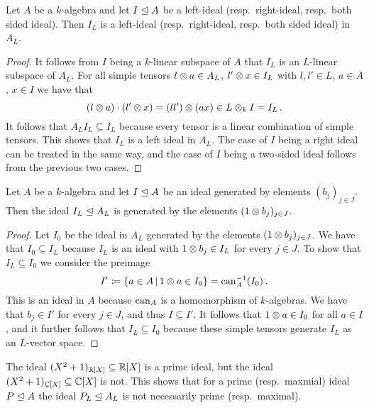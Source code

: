 \begin{lemma}
  Let $A$ be a $k$-algebra and let $I \trianglelefteq A$ be a left-ideal (resp.\ right-ideal, resp.\ both sided ideal).
  Then $I_L$ is a left-ideal (resp.\ right-ideal, resp.\ both sided ideal) in $A_L$.
\end{lemma}
\begin{proof}
  It follows from $I$ being a $k$-linear subspace of $A$ that $I_L$ is an $L$-linear subspace of $A_L$.
  For all simple tensors $l \mathbin{\otimes} a \in A_L$, $l' \mathbin{\otimes} x \in I_L$ with $l, l' \in L$, $a \in A$, $x \in I$ we have that
  \[
        (l \mathbin{\otimes} a) \cdot (l' \mathbin{\otimes} x)
    =   (l l') \mathbin{\otimes} (a x)
    \in L \mathbin{\otimes}_k I
    =   I_L \,.
  \]
  It follows that $A_L I_L \subseteq I_L$ because every tensor is a linear combination of simple tensors.
  This shows that $I_L$ is a left ideal in $A_L$.
  The case of $I$ being a right ideal can be treated in the same way, and the case of $I$ being a two-sided ideal follows from the previous two cases.
\end{proof}


\begin{lemma}
  Let $A$ be a $k$-algebra and let $I \trianglelefteq A$ be an ideal generated by elements $(b_j)_{j \in J}$.
  Then the ideal $I_L \trianglelefteq A_L$ is generated by the elements $(1 \mathbin{\otimes} b_j)_{j \in J}$.
\end{lemma}
\begin{proof}
  Let $I_0$ be the ideal in $A_L$ generated by the elements $(1 \mathbin{\otimes} b_j)_{j \in J}$.
  We have that $I_0 \subseteq I_L$ because $I_L$ is an ideal with $1 \mathbin{\otimes} b_j \in I_L$ for every $j \in J$.
  To show that $I_L \subseteq I_0$ we consider the preimage
  \[
              I'
    \defined  \{
                a \in A
              \suchthat
                1 \tensor a \in I_0
              \}
    =         \can_A^{-1}(I_0) \,.
  \]
  This is an ideal in $A$ because $\operatorname{can}_A$ is a homomorphism of $k$-algebras.
  We have that $b_j \in I'$ for every $j \in J$, and thus $I \subseteq I'$.
  It follows that $1 \mathbin{\otimes} a \in I_0$ for all $a \in I$, and it further follows that $I_L \subseteq I_0$ because these simple tensors generate $I_L$ as an $L$-vector space.
\end{proof}


\begin{warning}
  The ideal $(X^2+1)_{\mathbb{R}[X]} \subseteq \mathbb{R}[X]$ is a prime ideal, but the ideal $(X^2+1)_{\mathbb{C}[X]} \subseteq \mathbb{C}[X]$ is not.
  This shows that for a prime (resp.\ maxmial) ideal $P \trianglelefteq A$ the ideal $P_L \trianglelefteq A_L$ is not necessarily prime (resp.\ maximal).
\end{warning}




